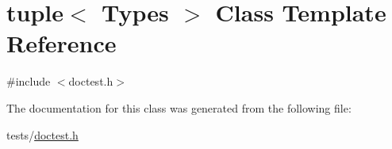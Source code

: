 \hypertarget{classtuple}{}\section{tuple$<$ Types $>$ Class Template Reference}
\label{classtuple}


{\ttfamily \#include $<$doctest.\+h$>$}



The documentation for this class was generated from the following file\+:\begin{DoxyCompactItemize}
\item 
tests/\hyperlink{doctest_8h}{doctest.\+h}\end{DoxyCompactItemize}
